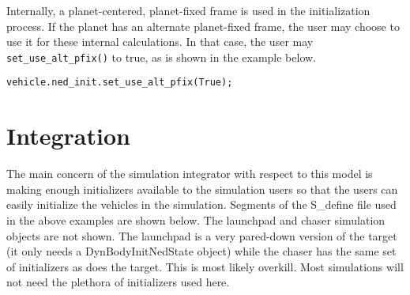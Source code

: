 Internally, a planet-centered, planet-fixed frame is used in the
initialization process. If the planet has an alternate planet-fixed
frame, the user may choose to use it for these internal calculations.
In that case, the user may {\tt set\_use\_alt\_pfix()} to true, as is shown in
the example below.

\begin{verbatim}
vehicle.ned_init.set_use_alt_pfix(True);
\end{verbatim}

\section{Integration}

The main concern of the simulation integrator with respect to this
model is making enough initializers available to the simulation users
so that the users can easily initialize the vehicles in the simulation.
Segments of the S\_define file used in the above examples are shown below.
The launchpad and chaser simulation objects are not shown. The launchpad is a
very pared-down version of the target (it only needs a DynBodyInitNedState
object) while the chaser has the same set of initializers as does the target.
This is most likely overkill. Most simulations will not need the plethora
of initializers used here.
